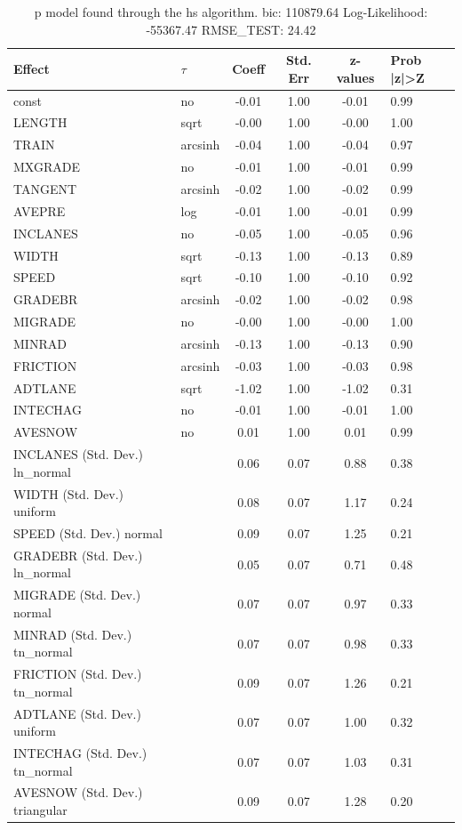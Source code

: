 \begin{table}
	\caption{p model found through the hs algorithm. bic: 110879.64 Log-Likelihood: -55367.47 RMSE_TEST: 24.42}
	\begin{center}
		\begin{tabular}{|l|l|c|c|c|l|}
			\hline
			Effect & $\tau$ & Coeff & Std. Err & z-values & Prob |z|>Z \\
			\hline
			const & no & -0.01 & 1.00 & -0.01 & 0.99 \\
			\hline
			LENGTH & sqrt & -0.00 & 1.00 & -0.00 & 1.00 \\
			\hline
			TRAIN & arcsinh & -0.04 & 1.00 & -0.04 & 0.97 \\
			\hline
			MXGRADE & no & -0.01 & 1.00 & -0.01 & 0.99 \\
			\hline
			TANGENT & arcsinh & -0.02 & 1.00 & -0.02 & 0.99 \\
			\hline
			AVEPRE & log & -0.01 & 1.00 & -0.01 & 0.99 \\
			\hline
			INCLANES & no & -0.05 & 1.00 & -0.05 & 0.96 \\
			\hline
			WIDTH & sqrt & -0.13 & 1.00 & -0.13 & 0.89 \\
			\hline
			SPEED & sqrt & -0.10 & 1.00 & -0.10 & 0.92 \\
			\hline
			GRADEBR & arcsinh & -0.02 & 1.00 & -0.02 & 0.98 \\
			\hline
			MIGRADE & no & -0.00 & 1.00 & -0.00 & 1.00 \\
			\hline
			MINRAD & arcsinh & -0.13 & 1.00 & -0.13 & 0.90 \\
			\hline
			FRICTION & arcsinh & -0.03 & 1.00 & -0.03 & 0.98 \\
			\hline
			ADTLANE & sqrt & -1.02 & 1.00 & -1.02 & 0.31 \\
			\hline
			INTECHAG & no & -0.01 & 1.00 & -0.01 & 1.00 \\
			\hline
			AVESNOW & no & 0.01 & 1.00 & 0.01 & 0.99 \\
			\hline
			INCLANES (Std. Dev.) ln_normal &  & 0.06 & 0.07 & 0.88 & 0.38 \\
			\hline
			WIDTH (Std. Dev.) uniform &  & 0.08 & 0.07 & 1.17 & 0.24 \\
			\hline
			SPEED (Std. Dev.) normal &  & 0.09 & 0.07 & 1.25 & 0.21 \\
			\hline
			GRADEBR (Std. Dev.) ln_normal &  & 0.05 & 0.07 & 0.71 & 0.48 \\
			\hline
			MIGRADE (Std. Dev.) normal &  & 0.07 & 0.07 & 0.97 & 0.33 \\
			\hline
			MINRAD (Std. Dev.) tn_normal &  & 0.07 & 0.07 & 0.98 & 0.33 \\
			\hline
			FRICTION (Std. Dev.) tn_normal &  & 0.09 & 0.07 & 1.26 & 0.21 \\
			\hline
			ADTLANE (Std. Dev.) uniform &  & 0.07 & 0.07 & 1.00 & 0.32 \\
			\hline
			INTECHAG (Std. Dev.) tn_normal &  & 0.07 & 0.07 & 1.03 & 0.31 \\
			\hline
			AVESNOW (Std. Dev.) triangular &  & 0.09 & 0.07 & 1.28 & 0.20 \\
			\hline
		\end{tabular}
	\end{center}
\end{table}